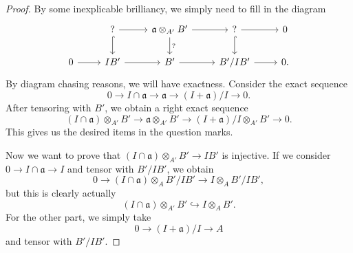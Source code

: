\documentclass[leqno, openany]{memoir}
\theoremstyle{definition}
\theoremstyle{remark}
\theoremstyle{plain}
\theoremstyle{definition}
\theoremstyle{remark}
\newcommand{\mf}[1]{\mathfrak{#1}}
\begin{document}
\begin{proof}
    By some inexplicable brilliancy, we simply need to fill in the diagram
    \begin{equation*}
    \begin{tikzcd}
        & ? \ar{r} \ar[hookrightarrow]{d} & \mf{a} \otimes_{A'} B' \ar{r} \ar{d}{?} & ? \ar{r} \ar[hookrightarrow]{d} & 0 \\
        0 \ar{r} & IB' \ar{r} & B' \ar{r} & B'/IB' \ar{r} & 0.
    \end{tikzcd}
    \end{equation*}
    By diagram chasing reasons, we will have exactness. Consider the exact sequence
    \[ 0 \to I \cap \mf{a} \to \mf{a} \to (I+\mf{a})/I \to 0. \]
    After tensoring with $B'$, we obtain a right exact sequence
    \[ (I \cap \mf{a}) \otimes_{A'} B' \to \mf{a} \otimes_{A'} B' \to (I + \mf{a})/I \otimes_{A'} B' \to 0. \]
    This gives us the desired items in the question marks.

    Now we want to prove that $(I \cap \mf{a}) \otimes_{A'} B' \to IB'$ is injective. If we consider $0 \to I \cap \mf{a} \to I$ and tensor with $B' / IB'$, we obtain
    \[ 0 \to (I \cap \mf{a}) \otimes_A B'/IB' \to I \otimes_A B' / IB', \]
    but this is clearly actually
    \[ (I \cap \mf{a}) \otimes_{A'} B' \hookrightarrow I \otimes_A B'. \]
    For the other part, we simply take
    \[ 0 \to (I+\mf{a})/I \to A \]
    and tensor with $B'/IB'$.
\end{proof}
\end{document}
